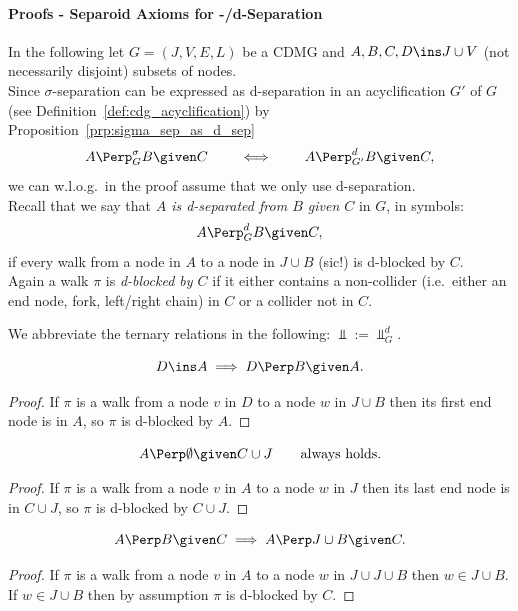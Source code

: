 \paragraph{Proofs - Separoid Axioms for \textsigma-/d-Separation}\hfill%

In the following let $G=(J,V,E,L)$ be a CDMG and $A,B,C,D \ins J \cup V$
(not necessarily disjoint) subsets of nodes.\\
Since $\sigma$-separation can be expressed as d-separation in an acyclification $G'$
of $G$ (see Definition~\ref{def:cdg_acyclification}) by Proposition~\ref{prp:sigma_sep_as_d_sep}
\[ A \Perp^\sigma_G B \given C  \qquad\iff\qquad A \Perp^d_{G'} B \given C, \]
we can w.l.o.g.\ in the proof assume that we only use d-separation.\\

Recall that we say that \emph{$A$ is d-separated from $B$ given $C$} in $G$, in symbols:
    \[ A \Perp^d_G B \given C, \]
 if every walk from a node in $A$ to a node in $J \cup B$ (sic!) is d-blocked by $C$. \\
 Again a walk $\pi$ is \emph{d-blocked by $C$} if it either contains a non-collider 
 (i.e.\ either an end node, fork, left/right chain) in $C$ or a collider not in $C$.

 We abbreviate the ternary relations in the following: $\displaystyle \Perp := \Perp_G^d$.


\begin{Lem}
    \[D \ins A \implies D \Perp  B \given A.\]
\begin{proof}
    If $\pi$ is a walk from a node $v$ in $D$ to a node $w$ in $J \cup B$ then its first end node is in $A$, so $\pi$ is d-blocked by $A$.
\end{proof}
\end{Lem}

\begin{Lem}
    \label{d-sep-restricted-right-redundancy}
    \[A \Perp  \emptyset \given C \cup J \qquad \text{always holds.}\]
\begin{proof}
    If $\pi$ is a walk from a node $v$ in $A$ to a node $w$ in $J$ then its last end node is in $C \cup J$, so $\pi$ is d-blocked by $C \cup J$.
\end{proof}
\end{Lem}


\begin{Lem}
    \[A \Perp  B \given C \implies A \Perp  J \cup B \given C.\]
\begin{proof}
 If $\pi$ is a walk from a node $v$ in $A$ to a node $w$ in $J \cup J \cup B$ then $w \in J \cup B$. %
 If $w \in J \cup B$ then by assumption $\pi$ is d-blocked by $C$.
\end{proof}
\end{Lem}

